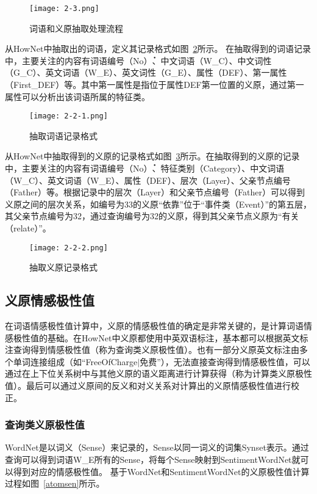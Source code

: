 \begin{figure}[htp]
\centering
\texttt{[image: 2-3.png]}
\caption{词语和义原抽取处理流程}
\label{atom}
\end{figure}

从HowNet中抽取出的词语，定义其记录格式如图~\ref{fig2-2-1}所示。
在抽取得到的词语记录中，主要关注的内容有词语编号（No\.）、中文词语（W\_C）、中文词性（G\_C）、英文词语（W\_E）、英文词性（G\_E）、属性（DEF）、第一属性（First\_DEF）等。其中第一属性是指位于属性DEF第一位置的义原，通过第一属性可以分析出该词语所属的特征类。

\begin{figure}[htp]
\centering
\texttt{[image: 2-2-1.png]}
\caption{抽取词语记录格式}
\label{fig2-2-1}
\end{figure}

从HowNet中抽取得到的义原的记录格式如图~\ref{fig2-2-2}所示。在抽取得到的义原的记录中，主要关注的内容有词语编号（No\.）、特征类别（Category）、中文词语（W\_C）、英文词语（W\_E）、属性（DEF）、层次（Layer）、父亲节点编号（Father）等。根据记录中的层次（Layer）和父亲节点编号（Father）可以得到义原之间的层次关系，如编号为33的义原“依靠”位于“事件类（Event）”的第五层，其父亲节点编号为32，通过查询编号为32的义原，得到其父亲节点义原为“有关（relate）”。

\begin{figure}[htp]
\centering
\texttt{[image: 2-2-2.png]}
\caption{抽取义原记录格式}
\label{fig2-2-2}
\end{figure}

\subsection{义原情感极性值}
在词语情感极性值计算中，义原的情感极性值的确定是非常关键的，是计算词语情感极性值的基础。在HowNet中义原都使用中英双语标注，基本都可以根据英文标注查询得到情感极性值（称为查询类义原极性值）。也有一部分义原英文标注由多个单词连接组成（如“FreeOfCharge$ | $免费”），无法直接查询得到情感极性值，可以通过在上下位关系树中与其他义原的语义距离进行计算获得（称为计算类义原极性值）。最后可以通过义原间的反义和对义关系对计算出的义原情感极性值进行校正。

\subsubsection{查询类义原极性值}
WordNet是以词义（Sense）来记录的，Sense以同一词义的词集Synset表示。通过查询可以得到词语W\_E所有的Sense，将每个Sense映射到SentimentWordNet就可以得到对应的情感极性值。
基于WordNet和SentimentWordNet的义原极性值计算过程如图~\ref{atomsen}所示。

